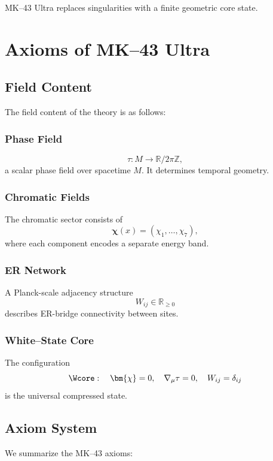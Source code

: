 MK--43 Ultra replaces singularities with a finite geometric core state.


\chapter{Axioms of MK--43 Ultra}

\section{Field Content}

The field content of the theory is as follows:

\subsection{Phase Field}
\[
  \tau : M \to \mathbb{R}/2\pi\mathbb{Z}, 
\]
a scalar phase field over spacetime $M$. 
It determines temporal geometry.

\subsection{Chromatic Fields}
The chromatic sector consists of
\[
  \bm{\chi}(x) = (\chi_1, \dots, \chi_7),
\]
where each component encodes a separate energy band.

\subsection{ER Network}
A Planck-scale adjacency structure
\[
W_{ij} \in \mathbb{R}_{\ge 0}
\]
describes ER-bridge connectivity between sites.

\subsection{White--State Core}
The configuration
\[
\Wcore: \quad
\bm{\chi}=0,\quad \nabla_\mu \tau =0,\quad W_{ij}=\delta_{ij}
\]
is the universal compressed state.

\section{Axiom System}

We summarize the MK--43 axioms:

